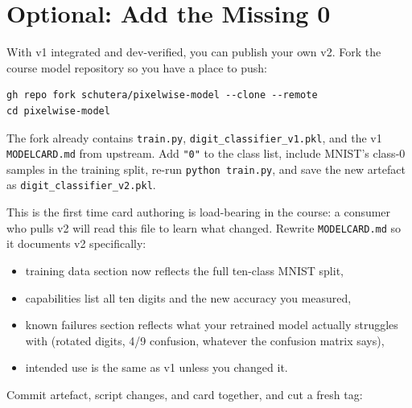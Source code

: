 \newpage
\section{Optional: Add the Missing 0}

With v1 integrated and dev-verified, you can publish your own v2.
Fork the course model repository so you have a place to push:

\begin{verbatim}
gh repo fork schutera/pixelwise-model --clone --remote
cd pixelwise-model
\end{verbatim}


The fork already contains \texttt{train.py}, \texttt{digit\_classifier\_v1.pkl},
and the v1 \texttt{MODELCARD.md} from upstream.
Add \texttt{"0"} to the class list, include MNIST's class-0 samples in
the training split, re-run \texttt{python train.py}, and save the new
artefact as \texttt{digit\_classifier\_v2.pkl}.

 This is the first time card
authoring is load-bearing in the course: a consumer who pulls v2 will
read this file to learn what changed.
Rewrite \texttt{MODELCARD.md} so it documents v2 specifically:

\begin{itemize}
    \item training data section now reflects the full ten-class MNIST
    split,
    \item capabilities list all ten digits and the new accuracy you
    measured,
    \item known failures section reflects what your retrained model
    actually struggles with (rotated digits, 4/9 confusion, whatever
    the confusion matrix says),
    \item intended use is the same as v1 unless you changed it.
\end{itemize}

Commit artefact, script changes, and card together, and cut a fresh tag:

